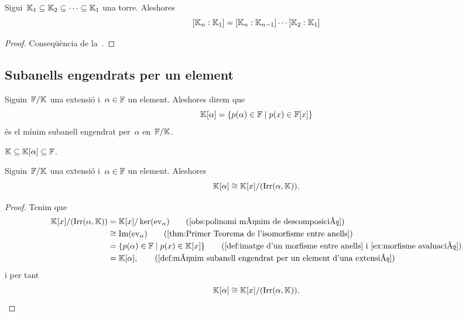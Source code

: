 \documentclass[../../main.tex]{subfiles}
\begin{document}
    \begin{corollary}
        \label{cor:fórmula de les torres}
        Sigui~\(\mathbb{K}_{1}\subseteq\mathbb{K}_{2}\subseteq\dots\subseteq\mathbb{K}_{1}\) una torre.
        Aleshores
        \[
            [\mathbb{K}_{n}:\mathbb{K}_{1}]=[\mathbb{K}_{n}:\mathbb{K}_{n-1}]\cdots[\mathbb{K}_{2}:\mathbb{K}_{1}]
        \]
        \begin{proof}
            Conseqüència de la~.
        \end{proof}
    \end{corollary}
\subsection{Subanells engendrats per un element}
    \begin{definition}
        \label{def:mínim subanell engendrat per un element d'una extensió}
        Siguin~\(\mathbb{F}/\mathbb{K}\) una extensió i~\(\alpha\in\mathbb{F}\) un element.
        Aleshores direm que
        \[
            \mathbb{K}[\alpha]=\{p(\alpha)\in\mathbb{F}\mid p(x)\in\mathbb{F}[x]\}
        \]
        és el mínim subanell engendrat per~\(\alpha\) en~\(\mathbb{F}/\mathbb{K}\).
    \end{definition}
    \begin{observation}
    \label{obs:l'anell engendrat per alpha està entre l'extensió}
        \(\mathbb{K}\subseteq\mathbb{K}[\alpha]\subseteq\mathbb{F}\).
    \end{observation}
    \begin{proposition}
        \label{prop:el mínim subanell engendrat per un element és l'anell de polinomis quocient l'irreductible de l'element}
        Siguin~\(\mathbb{F}/\mathbb{K}\) una extensió i~\(\alpha\in\mathbb{F}\) un element.
        Aleshores
        \[
            \mathbb{K}[\alpha]\cong\mathbb{K}[x]/(\operatorname{Irr}(\alpha,\mathbb{K})).
        \]
        \begin{proof}
            Tenim que
            \begin{align*}
                \KK[x]/(\Irr(\alpha,\KK))&=\KK[x]/\ker(\ev_{\alpha}) \tag{\ref{obs:polinomi mínim de descomposició}}\\
                &\cong\Ima(\ev_{\alpha}) \tag{\ref{thm:Primer Teorema de l'isomorfisme entre anells}}\\
                &=\{p(\alpha)\in\FF\mid p(x)\in\KK[x]\} \tag{\ref{def:imatge d'un morfisme entre anells} i \ref{ex:morfisme avaluació}}\\
                &= \KK[\alpha], \tag{\ref{def:mínim subanell engendrat per un element d'una extensió}}
            \end{align*}
            i per tant
            \[
                \mathbb{K}[\alpha]\cong\mathbb{K}[x]/(\operatorname{Irr}(\alpha,\mathbb{K})).\qedhere
            \]
        \end{proof}
    \end{proposition}
\end{document}
